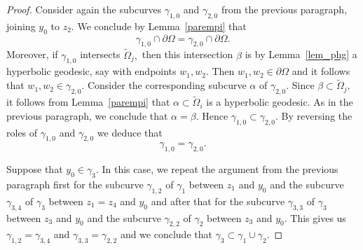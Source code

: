 \documentclass[reqno,11pt]{amsart}
\def\wz{\widetilde}
\numberwithin{equation}{section}
\theoremstyle{remark}
\begin{document}
\begin{proof}
Consider again the subcurves  $\gamma_{1,0}$ and $\gamma_{2,0}$ from the previous
paragraph, joining $y_0$ to $z_2$. We conclude by Lemma~\ref{parempi} that 
\begin{equation}\label{equ 20}
\gamma_{1,0}\cap \partial \Omega=\gamma_{2,0}\cap \partial \Omega.
\end{equation} 
Moreover, if 
$\gamma_{1,0}$ intersects $\wz \Omega_j,$ then this intersection $\beta$  is by 
Lemma~\ref{lem_phg} a hyperbolic geodesic, say with endpoints $w_1,w_2.$ 
Then $w_1,w_2\in \partial \Omega$ and it follows that $w_1,w_2\in \gamma_{2,0}.$
Consider the corresponding subcurve $\alpha$ of $\gamma_{2,0}.$ Since $\beta \subset \wz \Omega_j,$ it follows from Lemma~\ref{parempi} that $\alpha \subset
\wz \Omega_i$ is a hyperbolic geodesic.  As in the previous paragraph, we conclude that $\alpha=\beta.$
Hence  $\gamma_{1,0}\subset \gamma_{2,0}.$
By reversing the roles of  $\gamma_{1,0}$ and $\gamma_{2,0}$ we deduce that
\begin{equation}\label{ekatsamat}
\gamma_{1,0}=\gamma_{2,0}.
\end{equation}



Suppose that $y_0\in \gamma_3.$ In this case, we repeat the argument from the
previous paragraph first for the subcurve $\gamma_{1,2}$ of $\gamma_1$ between
$z_1$ and $y_0$ and the subcurve $\gamma_{3,4}$ of $\gamma_3$ 
between $z_1=z_4$ and $y_0$ and after that for the subcurve $\gamma_{3,3}$ of
$\gamma_3$ between $z_3$ and $y_0$ and the subcurve $\gamma_{2,2}$
of $\gamma_2$ between
$z_3$ and $y_0.$ This gives us $\gamma_{1,2}=\gamma_{3,4}$ and 
$\gamma_{3,3}=\gamma_{2,2}$ and we conclude that $\gamma_3\subset \gamma_1\cup 
\gamma_2.$ 
 

\end{proof}
\end{document}
